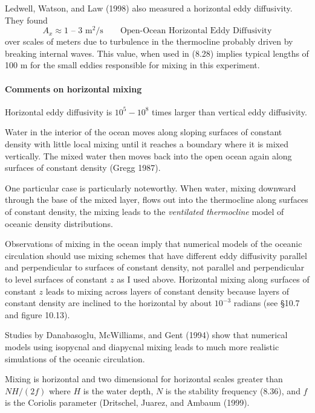 Ledwell, Watson, and Law (1998) also measured a horizontal eddy diffusivity. They found
\begin{equation}
A_x \approx 1 \text{ -- } 3 \text{ m$^2$/s} \qquad \text{Open-Ocean Horizontal
Eddy Diffusivity}
\end{equation}
over scales of meters due to turbulence in the thermocline probably driven by breaking internal waves. This value, when used in (8.28) implies typical lengths of 100 m for the small eddies responsible for mixing in this experiment.

\paragraph{Comments on horizontal mixing}

\begin{enumerate}
\vitem Horizontal eddy diffusivity is $10^5 - 10^8$ times larger than vertical eddy diffusivity.

\vitem {}Water in the interior of the ocean moves along sloping surfaces of constant density with little local mixing until it reaches a boundary where it is mixed vertically. The mixed water then moves back into the open ocean again along surfaces of constant density (Gregg 1987).

One particular case is particularly noteworthy. When water, mixing downward through the base of the mixed layer, flows out into the thermocline along surfaces of constant density, the mixing leads to the \textit{ventilated thermocline} model of oceanic density distributions. 

\vitem Observations of mixing in the ocean imply that numerical models of the oceanic circulation should use mixing schemes that have different eddy diffusivity parallel and perpendicular to surfaces of constant density, not parallel and perpendicular to level surfaces of constant $z$ as I used above. Horizontal mixing along surfaces of constant $z$ leads to mixing across layers of
constant density because layers of constant density are inclined to the horizontal by about
$10^{-3}$ radians (see \S10.7 and figure 10.13). 

Studies by Danabasoglu, McWilliams, and Gent (1994) show that numerical models using isopycnal and diapycnal mixing leads to much more realistic
simulations of the oceanic circulation.

\vitem Mixing is horizontal and two dimensional for horizontal scales greater than $NH/(2f)$
where $H$ is the water depth, $N$ is the stability frequency (8.36),
and
$f$ is the Coriolis parameter (Dritschel, Juarez, and Ambaum (1999).
\end{enumerate}
\vspace{-2ex}

